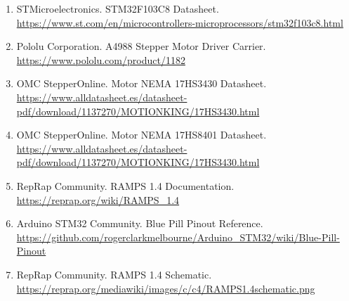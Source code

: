 \documentclass[12pt]{article}
\begin{document}
\begin{enumerate}
  \item \label{ref1} STMicroelectronics. STM32F103C8 Datasheet. \\
  \url{https://www.st.com/en/microcontrollers-microprocessors/stm32f103c8.html}
  
  \item \label{ref2} Pololu Corporation. A4988 Stepper Motor Driver Carrier. \\
  \url{https://www.pololu.com/product/1182}
  
  \item \label{ref3} OMC StepperOnline. Motor NEMA 17HS3430 Datasheet. \\
  \url{https://www.alldatasheet.es/datasheet-pdf/download/1137270/MOTIONKING/17HS3430.html}
  
  \item \label{ref4} OMC StepperOnline. Motor NEMA 17HS8401 Datasheet. \\
  \url{https://www.alldatasheet.es/datasheet-pdf/download/1137270/MOTIONKING/17HS3430.html}
  
  \item \label{ref5} RepRap Community. RAMPS 1.4 Documentation. \\
  \url{https://reprap.org/wiki/RAMPS_1.4}
  
  \item \label{ref6} Arduino STM32 Community. Blue Pill Pinout Reference. \\
  \url{https://github.com/rogerclarkmelbourne/Arduino_STM32/wiki/Blue-Pill-Pinout}
  
  \item \label{ref7} RepRap Community. RAMPS 1.4 Schematic. \\
  \url{https://reprap.org/mediawiki/images/c/c4/RAMPS1.4schematic.png}
\end{enumerate}
\end{document}
